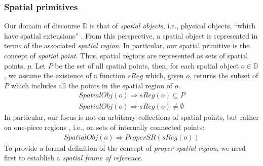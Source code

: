 \documentclass{article}
\begin{document}
\subsubsection{Spatial primitives} Our domain of discourse $\mathbb{D}$ is that of \textit{spatial objects}, i.e., physical objects, ``which have spatial extensions'' \cite{cohn_chapter_2008}. From this perspective, a spatial object is represented in terms of the associated \textit{spatial region}. In particular, our spatial primitive is the concept of \textit{spatial point}. Thus, spatial regions are represented as sets of spatial points, $p$. Let $P$ be the set of all spatial points, then, for each spatial object $o \in \mathbb{D}$, we assume the existence of a function $sReg$ which, given $o$, returns the subset of $P$ which includes all the points in the spatial region of $o$.  
\begin{align}
\textit{SpatialObj}(o) \Rightarrow \textit{sReg}(o) \subseteq P \\
\textit{SpatialObj}(o) \Rightarrow \textit{sReg}(o) \neq \emptyset
\end{align}
In particular, our focus is not on arbitrary collections of spatial points, but rather on one-piece regions \cite{cohn_chapter_2008}, i.e., on sets of internally connected points:
\begin{align}
    \textit{SpatialObj}(o) \Rightarrow \textit{ProperSR}(\textit{sReg}(o)) 
\end{align}
To provide a formal definition of the concept of \textit{proper spatial region}, we need first to establish a \textit{spatial frame of reference}. 
\end{document}
